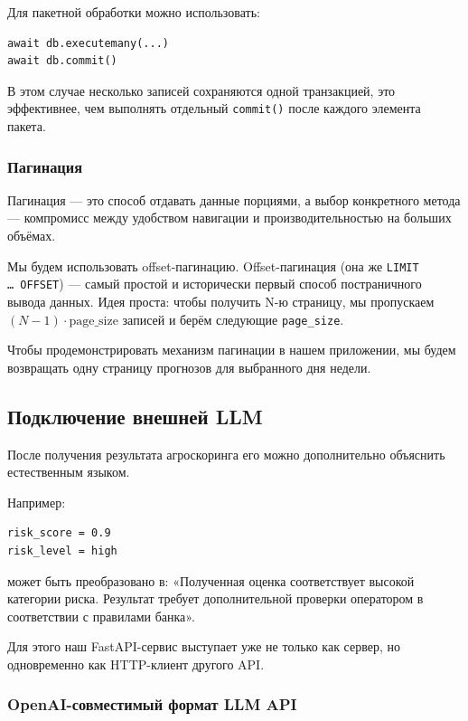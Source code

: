 \documentclass[12pt,a4paper]{article}
\begin{document}
Для пакетной обработки можно использовать:

\begin{lstlisting}[caption={Пакетная запись}]
await db.executemany(...)
await db.commit()
\end{lstlisting}

В этом случае несколько записей сохраняются одной транзакцией, это эффективнее, чем выполнять отдельный \texttt{commit()} после каждого элемента пакета.

\subsubsection{Пагинация}

Пагинация — это способ отдавать данные порциями, а выбор конкретного метода — компромисс между удобством навигации и производительностью на больших объёмах.

Мы будем использовать offset-пагинацию. Offset-пагинация (она же \texttt{LIMIT \dots\ OFFSET}) — самый простой и исторически первый способ постраничного вывода данных. Идея проста: чтобы получить N-ю страницу, мы пропускаем $(N-1) \cdot \text{page\_size}$ записей и берём следующие \texttt{page\_size}.

Чтобы продемонстрировать механизм пагинации в нашем приложении, мы будем возвращать одну страницу прогнозов для выбранного дня недели.

\subsection{Подключение внешней LLM}

После получения результата агроскоринга его можно дополнительно объяснить естественным языком.

Например:

\begin{lstlisting}[caption={Пример результата}]
risk_score = 0.9
risk_level = high
\end{lstlisting}

может быть преобразовано в: «Полученная оценка соответствует высокой категории риска. Результат требует дополнительной проверки оператором в соответствии с правилами банка».

Для этого наш FastAPI-сервис выступает уже не только как сервер, но одновременно как HTTP-клиент другого API.

\subsubsection{OpenAI-совместимый формат LLM API}
\end{document}

